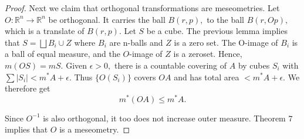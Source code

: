 \documentclass[letter]{article}
\newenvironment{menumerate}{%
  \edef\backupindent{\the\parindent}%
  \enumerate%
  \setlength{\parindent}{\backupindent}%
}{\endenumerate}
\begin{document}
\begin{menumerate}
\begin{proof}
		Next we claim that orthogonal transformations are meseometries. Let $O:\mathbb{R}^n \to \mathbb{R}^n$ be orthogonal. It carries the ball $B(r,p),$ to the ball $B(r, Op),$ which is a translate of $B(r,p).$ Let $S$ be a cube. The previous lemma implies that $S = \bigsqcup B_i \cup Z$ where $B_i$ are n-balls and $Z$ is a zero set. The O-image of $B_i$ is
		a ball of equal measure, and the $O$-image of $Z$ is a zeroset. Hence,
		$m(OS) = mS.$ Given $\epsilon > 0,$ there is a countable covering of $A$ by cubes $S_i$ with $\sum |S_i| < m^*A + \epsilon$. Thus $\{O(S_i)\}$ covers $OA$ and has total area $< m^*A + \epsilon.$ We therefore get
		\begin{equation}
		  	m^*(OA) \leq m^*A.
		  \end{equation}  

		Since $O^{-1}$ is also orthogonal, it too does not increase outer measure. Theorem $7$ implies that $O$ is a meseometry.


\end{proof}
\end{menumerate}
\end{document}
